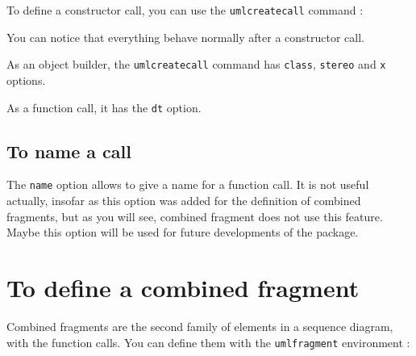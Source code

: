 \documentclass[a4paper,11pt]{report}
\newcommand{\inputTikZ}[1]{%
  }%
\newcommand{\inputTikZ}[1]{%
    \texttt{[image: fig/\#1.pdf]}%
  }%
\begin{document}
To define a constructor call, you can use the {\tt umlcreatecall} command :

\medskip

\begin{minipage}{0.5\textwidth}

\end{minipage}
\begin{minipage}{0.5\textwidth}
\begin{center}
\inputTikZ{createcall}
\end{center}
\end{minipage}

\medskip

You can notice that everything behave normally after a constructor call.

\medskip

As an object builder, the {\tt umlcreatecall} command has {\tt class}, {\tt stereo} and {\tt x} options.

As a function call, it has the {\tt dt} option.

\subsection{To name a call}\label{ss.callname}

The {\tt name} option allows to give a name for a function call. It is not useful actually, insofar as this option was added for the definition of combined fragments, but as you will see, combined fragment does not use this feature. Maybe this option will be used for future developments of the package.

\section{To define a combined fragment}\label{s.fragments}

Combined fragments are the second family of elements in a sequence diagram, with the function calls. You can define them with the {\tt umlfragment} environment :

\medskip

\begin{minipage}{0.5\textwidth}

\end{minipage}
\begin{minipage}{0.5\textwidth}
\begin{center}
\inputTikZ{fragment}
\end{center}
\end{minipage}
\end{document}

